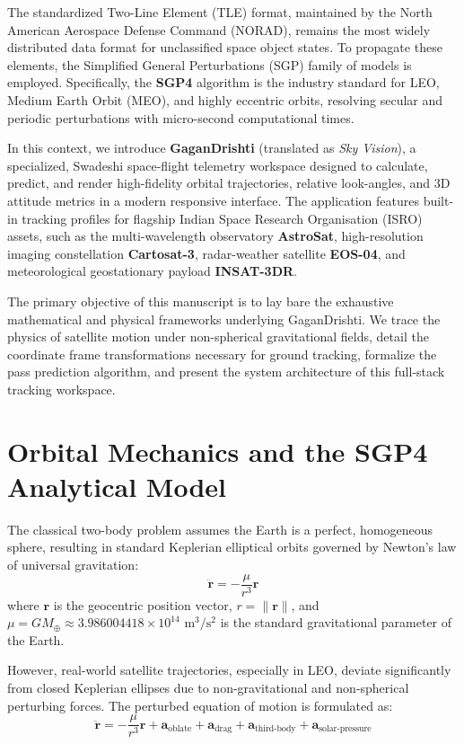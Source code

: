 \documentclass[11pt,journal,onecolumn]{IEEEtran}
\begin{document}
The standardized Two-Line Element (TLE) format, maintained by the North American Aerospace Defense Command (NORAD), remains the most widely distributed data format for unclassified space object states. To propagate these elements, the Simplified General Perturbations (SGP) family of models is employed. Specifically, the \textbf{SGP4} algorithm is the industry standard for LEO, Medium Earth Orbit (MEO), and highly eccentric orbits, resolving secular and periodic perturbations with micro-second computational times.

In this context, we introduce \textbf{GaganDrishti} (translated as \textit{Sky Vision}), a specialized, Swadeshi space-flight telemetry workspace designed to calculate, predict, and render high-fidelity orbital trajectories, relative look-angles, and 3D attitude metrics in a modern responsive interface. The application features built-in tracking profiles for flagship Indian Space Research Organisation (ISRO) assets, such as the multi-wavelength observatory \textbf{AstroSat}, high-resolution imaging constellation \textbf{Cartosat-3}, radar-weather satellite \textbf{EOS-04}, and meteorological geostationary payload \textbf{INSAT-3DR}.

The primary objective of this manuscript is to lay bare the exhaustive mathematical and physical frameworks underlying GaganDrishti. We trace the physics of satellite motion under non-spherical gravitational fields, detail the coordinate frame transformations necessary for ground tracking, formalize the pass prediction algorithm, and present the system architecture of this full-stack tracking workspace.

\section{Orbital Mechanics and the SGP4 Analytical Model}
The classical two-body problem assumes the Earth is a perfect, homogeneous sphere, resulting in standard Keplerian elliptical orbits governed by Newton's law of universal gravitation:
\begin{equation}
\mathbf{\ddot{r}} = -\frac{\mu}{r^3} \mathbf{r}
\label{eq:twobody}
\end{equation}
where $\mathbf{r}$ is the geocentric position vector, $r = \|\mathbf{r}\|$, and $\mu = G M_{\oplus} \approx 3.986004418 \times 10^{14}\text{ m}^3/\text{s}^2$ is the standard gravitational parameter of the Earth.

However, real-world satellite trajectories, especially in LEO, deviate significantly from closed Keplerian ellipses due to non-gravitational and non-spherical perturbing forces. The perturbed equation of motion is formulated as:
\begin{equation}
\mathbf{\ddot{r}} = -\frac{\mu}{r^3} \mathbf{r} + \mathbf{a}_{\text{oblate}} + \mathbf{a}_{\text{drag}} + \mathbf{a}_{\text{third-body}} + \mathbf{a}_{\text{solar-pressure}}
\label{eq:perturbed}
\end{equation}
\end{document}
